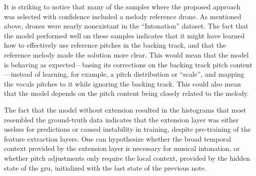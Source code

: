 It is striking to notice that many of the samples where the proposed approach was selected with confidence included a melody reference drone. As mentioned above, drones were nearly nonexistant in the ``Intonation'' dataset. The fact that the model performed well on these samples indicates that it might have learned how to effectively use reference pitches in the backing track, and that the reference melody made the solution more clear. This would mean that the model is behaving as expected---basing its corrections on the backing track pitch content---instead of learning, for example, a pitch distribution or ``scale'', and mapping the vocals pitches to it while ignoring the backing track. This could also mean that the model depends on the pitch content being closely related to the melody.

The fact that the model without extension resulted in the histograms that most resembled the ground-truth data indicates that the extension layer was either useless for predictions or caused instability in training, despite pre-training of the feature extraction layers. One can hypothesize whether the broad temporal context provided by the extension layer is necessary for musical intonation, or whether pitch adjustments only require the local context, provided by the hidden state of the \gls{gru}, initialized with the last state of the previous note.